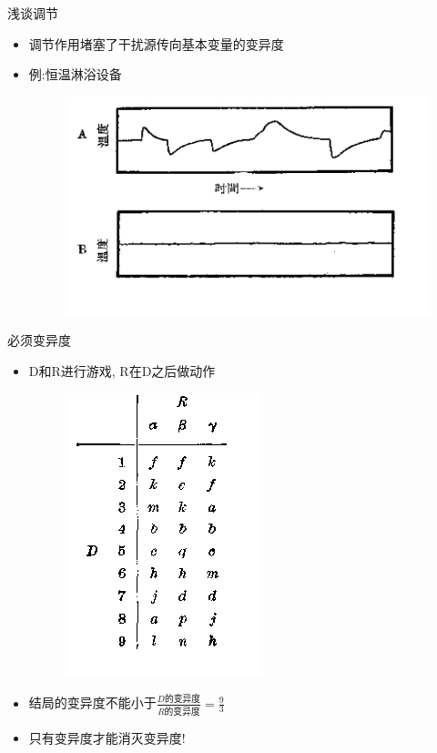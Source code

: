 \documentclass[12pt,AutoFakeBold,aspectratio=43,mathserif]{beamer}
\begin{document}
    \begin{frame}{浅谈调节}
        \begin{itemize}
                \item 调节作用堵塞了干扰源传向基本变量的变异度
                \item 例:恒温淋浴设备
               \begin{figure}[H]
                \centering
                \includegraphics[width=.6\textwidth]{figures/pic1.png}
                \end{figure}
        \end{itemize}
        
    \end{frame}
    \begin{frame}{必须变异度}
        \begin{itemize}
              \item D和R进行游戏, R在D之后做动作
              \begin{figure}[H]
                \centering
                \includegraphics[width=.4\textwidth]{figures/pic2.png}
                \end{figure}
                \item 结局的变异度不能小于$\frac{D\text{的变异度}}{R\text{的变异度}}=\frac{9}{3}$
                \item 只有变异度才能消灭变异度!
        \end{itemize}
    \end{frame}
\end{document}
